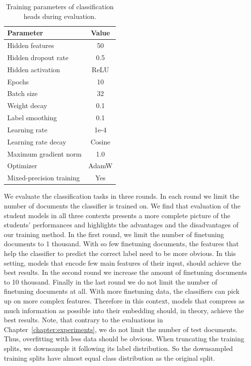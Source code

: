 \begin{table}
  \footnotesize
  \centering

  \begin{tabular}{l c}
    \toprule
    Parameter & Value \\
    \midrule
    Hidden features & 50 \\
    Hidden dropout rate & 0.5 \\
    Hidden activation & ReLU \\
    Epochs & 10 \\
    Batch size & 32 \\
    Weight decay & 0.1 \\
    Label smoothing & 0.1 \\
    Learning rate & 1e-4 \\
    Learning rate decay & Cosine \\
    Maximum gradient norm & 1.0 \\
    Optimizer & AdamW \\
    Mixed-precision training & Yes \\
    \bottomrule
  \end{tabular}

  \caption{Training parameters of classification heads during evaluation.}

  \label{table:head_train_eval_params}

\end{table}

We evaluate the classification tasks in three rounds. In each round we limit
the number of documents the classifier is trained on. We find that evaluation
of the student models in all three contexts presents a more complete picture of
the students' performances and highlights the advantages and the disadvantages
of our training method. In the first round, we limit the number of finetuning
documents to 1 thousand. With so few finetuning documents, the features that
help the classifier to predict the correct label need to be more obvious. In
this setting, models that encode few main features of their input, should
achieve the best results. In the second round we increase the amount of
finetuning documents to 10 thousand. Finally in the last round we do not limit
the number of finetuning documents at all. With more finetuning data, the
classifiers can pick up on more complex features. Therefore in this context,
models that compress as much information as possible into their embedding
should, in theory, achieve the best results. Note, that contrary to the
evaluations in Chapter~\ref{chapter:experiments}, we do not limit the number of
test documents. Thus, overfitting with less data should be obvious. When
truncating the training splits, we downsample it following its label
distribution. So the downsampled training splits have almost equal class
distribution as the original split.

